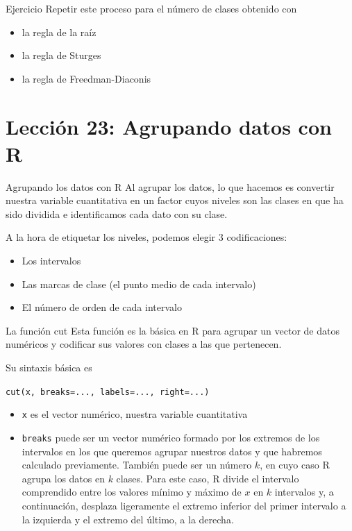 \documentclass[
  ignorenonframetext,
  aspectratio=169]{beamer}
\providecommand{\tightlist}{%
  \setlength{\itemsep}{0pt}\setlength{\parskip}{0pt}}
\begin{document}
\begin{frame}{Ejercicio}
\label{ejercicio}
Repetir este proceso para el número de clases obtenido con

\begin{itemize}
\tightlist
\item
  la regla de la raíz
\item
  la regla de Sturges
\item
  la regla de Freedman-Diaconis
\end{itemize}
\end{frame}

\section{Lección 23: Agrupando datos con
R}\label{lecciuxf3n-23-agrupando-datos-con-r}

\begin{frame}{Agrupando los datos con R}
\label{agrupando-los-datos-con-r}
Al agrupar los datos, lo que hacemos es convertir nuestra variable
cuantitativa en un factor cuyos niveles son las clases en que ha sido
dividida e identificamos cada dato con su clase.

A la hora de etiquetar los niveles, podemos elegir 3 codificaciones:

\begin{itemize}
\tightlist
\item
  Los intervalos
\item
  Las marcas de clase (el punto medio de cada intervalo)
\item
  El número de orden de cada intervalo
\end{itemize}
\end{frame}

\begin{frame}[fragile]{La función cut}
\label{la-funciuxf3n-cut}
Esta función es la básica en R para agrupar un vector de datos numéricos
y codificar sus valores con clases a las que pertenecen.

Su sintaxis básica es

\texttt{cut(x,\ breaks=...,\ labels=...,\ right=...)}

\begin{itemize}
\tightlist
\item
  \texttt{x} es el vector numérico, nuestra variable cuantitativa
\item
  \texttt{breaks} puede ser un vector numérico formado por los extremos
  de los intervalos en los que queremos agrupar nuestros datos y que
  habremos calculado previamente. También puede ser un número \(k\), en
  cuyo caso R agrupa los datos en \(k\) clases. Para este caso, R divide
  el intervalo comprendido entre los valores mínimo y máximo de \(x\) en
  \(k\) intervalos y, a continuación, desplaza ligeramente el extremo
  inferior del primer intervalo a la izquierda y el extremo del último,
  a la derecha.
\end{itemize}
\end{frame}
\end{document}
